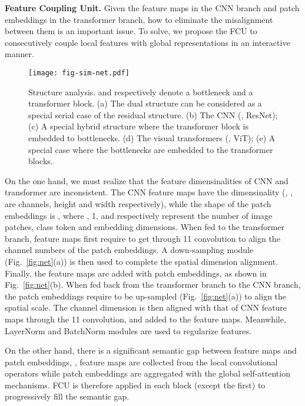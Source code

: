 \documentclass[10pt,twocolumn,letterpaper]{article}
\begin{document}
\noindent\textbf{Feature Coupling Unit.}
Given the feature maps in the CNN branch and patch embeddings in the transformer branch, how to eliminate the misalignment between them is an important issue. To solve, we propose the FCU to consecutively couple local features with global representations in an interactive manner.



\begin{figure}[t]
\begin{center}
\texttt{[image: fig-sim-net.pdf]}
\end{center}
\vspace{-1em}
\caption{Structure analysis.  and  respectively denote a bottleneck and a transformer block. (a) The dual structure can be considered as a special serial case of the residual structure. (b) The CNN (, ResNet); (c) A special hybrid structure where the transformer block is embedded to bottlenecks. (d) The visual transformers (, ViT); (e) A special case where the bottlenecks are embedded to the transformer blocks. 
}
\label{fig:simnet}
\end{figure}


On the one hand, we must realize that the feature dimensinalities of CNN and transformer are inconsistent. The CNN feature maps have the dimensinality  (, ,  are channels, height and width respectively), while the shape of the patch embeddings is , where , 1, and  respectively represent the number of image patches, class token and embedding dimensions.
When fed to the transformer branch, feature maps first require to get through 11 convolution to align the channel numbers of the patch embeddings. A down-sampling module (Fig.~\ref{fig:net}(a)) is then used to complete the spatial dimension alignment. Finally, the feature maps are added with patch embeddings, as shown in Fig.~\ref{fig:net}(b). 
When fed back from the transformer branch to the CNN branch, the patch embeddings require to be up-sampled (Fig.~\ref{fig:net}(a)) to align the spatial scale. The channel dimension is then aligned with that of CNN feature maps through the 11 convolution, and added to the feature maps. Meanwhile, LayerNorm and BatchNorm modules are used to regularize features.

On the other hand, there is a significant semantic gap between feature maps and patch embeddings, , feature maps are collected from the local convolutional operators while patch embeddings are aggregated with the global self-attention mechanisms. FCU is therefore applied in each block (except the first) to progressively fill the semantic gap.
\end{document}
